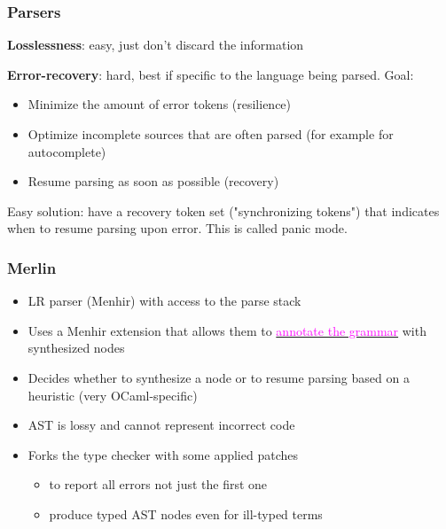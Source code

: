 \documentclass[compress,12pt,xcolor={dvipsnames}]{beamer}
\let\oldhref\href
\renewcommand{\href}[2]{\oldhref{#1}{\textcolor{magenta}{#2}}}
\begin{document}
\begin{frame}
	\frametitle{Parsers}

	\textbf{Losslessness}: easy, just don't discard the information

	\textbf{Error-recovery}: hard, best if specific to the language being parsed. Goal:

	\begin{itemize}
		\item Minimize the amount of error tokens (resilience)
		\item Optimize incomplete sources that are often parsed (for example for autocomplete)
		\item Resume parsing as soon as possible (recovery)
	\end{itemize}

	\quad Easy solution: have a recovery token set ("synchronizing tokens") that indicates when to resume parsing upon error. This is called panic mode.
\end{frame}


\begin{frame}
	\frametitle{Merlin}
	\begin{itemize}
		\item LR parser (Menhir) with access to the parse stack
		\item Uses a Menhir extension that allows them to \href{https://arxiv.org/pdf/1807.06702\#subsection.3.6}{annotate the grammar} with synthesized nodes
		\item Decides whether to synthesize a node or to resume parsing based on a heuristic (very OCaml-specific)
		\item AST is lossy and cannot represent incorrect code
		\item Forks the type checker with some applied patches
		      \begin{itemize}
			      \item to report all errors not just the first one
			      \item produce typed AST nodes even for ill-typed terms
		      \end{itemize}
	\end{itemize}
\end{frame}
\end{document}

